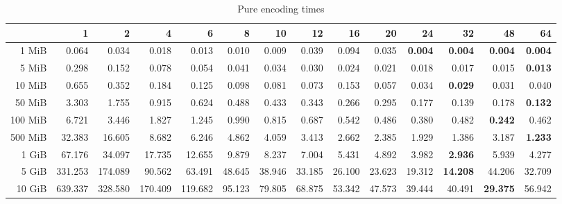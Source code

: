 \begin{table}[!h]
	\centering
	\caption{Pure encoding times}
	\begin{tabular}{rrrrrrrrrrrrrr}
		\toprule
		\diagbox[width=7em]{Size}{Threads}  &      1  &      2  &      4  &      6  &     8  &     10 &     12 &     16 &     20 &     24 &     32 &     48 &     64 \\
		\midrule
		1 MiB   &   0.064 &   0.034 &   0.018 &   0.013 &  0.010 &  0.009 &  0.039 &  0.094 &  0.035 &  \textbf{0.004} &  \textbf{0.004} &  \textbf{0.004} &  \textbf{0.004} \\
		5 MiB   &   0.298 &   0.152 &   0.078 &   0.054 &  0.041 &  0.034 &  0.030 &  0.024 &  0.021 &  0.018 &  0.017 &  0.015 &  \textbf{0.013} \\
		10 MiB  &   0.655 &   0.352 &   0.184 &   0.125 &  0.098 &  0.081 &  0.073 &  0.153 &  0.057 &  0.034 &  \textbf{0.029} &  0.031 &  0.040 \\
		50 MiB  &   3.303 &   1.755 &   0.915 &   0.624 &  0.488 &  0.433 &  0.343 &  0.266 &  0.295 &  0.177 &  0.139 &  0.178 &  \textbf{0.132} \\
		100 MiB &   6.721 &   3.446 &   1.827 &   1.245 &  0.990 &  0.815 &  0.687 &  0.542 &  0.486 &  0.380 &  0.482 &  \textbf{0.242} &  0.462 \\
		500 MiB &  32.383 &  16.605 &   8.682 &   6.246 &  4.862 &  4.059 &  3.413 &  2.662 &  2.385 &  1.929 &  1.386 &  3.187 &  \textbf{1.233} \\
		1 GiB   &  67.176 &  34.097 &  17.735 &  12.655 &  9.879 &  8.237 &  7.004 &  5.431 &  4.892 &  3.982 &  \textbf{2.936} &  5.939 &  4.277 \\
		5 GiB   & 331.253 & 174.089 &  90.562 &  63.491 & 48.645 & 38.946 & 33.185 & 26.100 & 23.623 & 19.312 & \textbf{14.208} & 44.206 & 32.709 \\
		10 GiB  & 639.337 & 328.580 & 170.409 & 119.682 & 95.123 & 79.805 & 68.875 & 53.342 & 47.573 & 39.444 & 40.491 & \textbf{29.375} & 56.942 \\
		\bottomrule
	\end{tabular}
\end{table}
